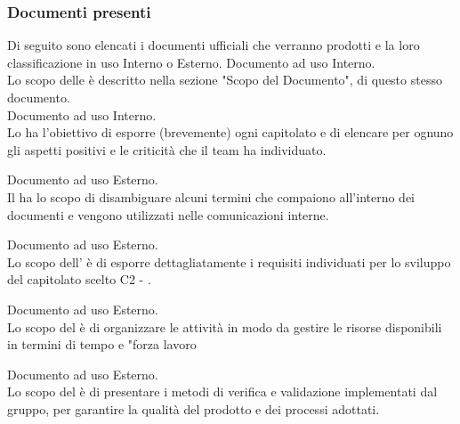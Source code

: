     \subsubsection{Documenti presenti}
      Di seguito sono elencati i documenti ufficiali che verranno prodotti e la loro classificazione in uso Interno o Esterno.
        Documento ad uso Interno.\\
        Lo scopo delle \textit{\NdP{}} è descritto nella sezione  "Scopo del Documento", di questo stesso documento.\\

        Documento ad uso Interno.\\
        Lo \textit{\SdF{}} ha l'obiettivo di esporre (brevemente) ogni capitolato e di elencare per ognuno gli aspetti positivi e le criticità che il team ha individuato.

        Documento ad uso Esterno.\\
       	Il \Glossario{}  ha lo scopo di disambiguare alcuni termini che compaiono all'interno dei documenti e vengono utilizzati nelle comunicazioni interne.

        Documento ad uso Esterno.\\
        Lo  scopo  dell'\textit{\AdR{}} è di esporre dettagliatamente i requisiti individuati per lo sviluppo del capitolato scelto C2 - \NomeProgetto{}.

        Documento ad uso Esterno.\\
        Lo scopo del \textit{\PdP{}} è di organizzare le attività in modo da gestire le risorse disponibili in termini di tempo e "forza lavoro

        Documento ad uso Esterno.\\
        Lo scopo del \textit{\PdQ{}} è di presentare i metodi di verifica e validazione implementati dal gruppo, per garantire la qualità del prodotto e dei processi adottati.

